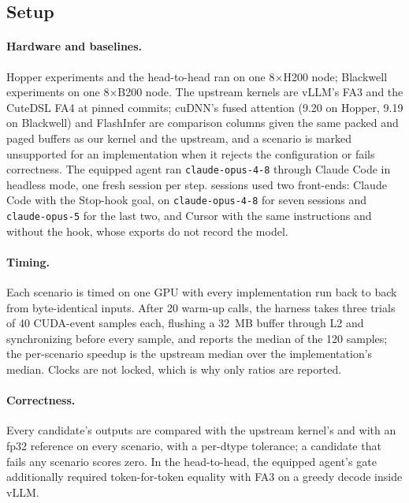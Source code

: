 \subsection{Setup}
\label{kernelseek:sec:eval-setup}

\paragraph{Hardware and baselines.} Hopper experiments and the head-to-head ran on one
8$\times$H200 node; Blackwell experiments on one 8$\times$B200 node. The upstream kernels are vLLM's
FA3 and the CuteDSL FA4 at pinned commits; cuDNN's fused attention (9.20 on Hopper, 9.19 on
Blackwell) and FlashInfer are comparison columns given the same packed and paged buffers as our
kernel and the upstream, and a scenario is marked unsupported for an implementation when it rejects
the configuration or fails correctness. The equipped agent ran \texttt{claude-opus-4-8} through
Claude Code in headless mode, one fresh session per step. \KernelSeek sessions used two front-ends:
Claude Code with the Stop-hook goal, on \texttt{claude-opus-4-8} for seven sessions and
\texttt{claude-opus-5} for the last two, and Cursor with the same instructions and without the
hook, whose exports do not record the model.

\paragraph{Timing.} Each scenario is timed on one GPU with every implementation run back to back
from byte-identical inputs. After 20 warm-up calls, the harness takes three trials of 40 CUDA-event
samples each, flushing a 32~MB buffer through L2 and synchronizing before every sample, and reports
the median of the 120 samples; the per-scenario speedup is the upstream median over the
implementation's median. Clocks are not locked, which is why only ratios are reported.

\paragraph{Correctness.} Every candidate's outputs are compared with the upstream kernel's and with
an fp32 reference on every scenario, with a per-dtype tolerance; a candidate that fails any scenario
scores zero. In the head-to-head, the equipped agent's gate additionally required token-for-token
equality with FA3 on a greedy decode inside vLLM.

